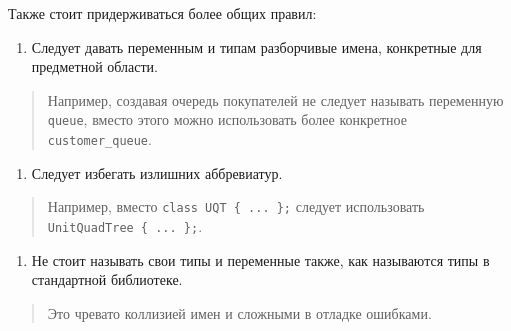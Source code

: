 Также стоит придерживаться более общих правил:

\begin{enumerate}
\item
  Следует давать переменным и типам разборчивые имена, конкретные для
  предметной области.
\end{enumerate}

\begin{quote}
Например, создавая очередь покупателей не следует называть переменную
\texttt{queue}, вместо этого можно использовать более конкретное
\texttt{customer\_queue}.
\end{quote}

\begin{enumerate}
\item
  Следует избегать излишних аббревиатур.
\end{enumerate}

\begin{quote}
Например, вместо \texttt{class\ UQT\ \{\ ...\ \};} следует использовать
\texttt{UnitQuadTree\ \{\ ...\ \};}.
\end{quote}

\begin{enumerate}
\item
  Не стоит называть свои типы и переменные также, как называются типы в
  стандартной библиотеке.
\end{enumerate}

\begin{quote}
Это чревато коллизией имен и сложными в отладке ошибками.
\end{quote}
